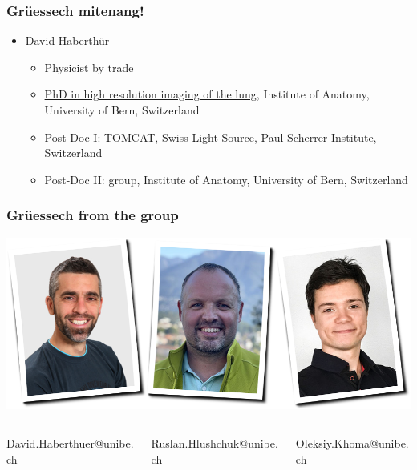 %


\begin{frame}
		\maketitle
\end{frame}

\begin{frame}
		\frametitle{Grüessech mitenang!}
		\begin{itemize}
				\item David Haberthür
						\begin{itemize}
								\item Physicist by trade
								\item \href{https://boris.unibe.ch/2619/}{PhD in high resolution imaging of the lung}, Institute of Anatomy, University of Bern, Switzerland
								\item Post-Doc I: \href{https://www.psi.ch/sls/tomcat/}{TOMCAT}, \href{https://www.psi.ch/sls/}{Swiss Light Source}, \href{https://www.psi.ch/}{Paul Scherrer Institute}, Switzerland
								\item Post-Doc II: \uct group, Institute of Anatomy, University of Bern, Switzerland
						\end{itemize}
		\end{itemize}
\end{frame}

\begin{frame}
		\frametitle{Grüessech from the \uct group}
		\centering%
		\includegraphics[width=\imagewidth]{./images/team}
		\begin{columns}[t,onlytextwidth]
				\hfill%
				\begin{column}{0.3\linewidth}
						David{\color{ubRed}.}Haberthuer{\color{ubRed}@unibe.ch}%
				\end{column}%
				\hfill%
				\begin{column}{0.3\linewidth}
						Ruslan{\color{ubRed}.}Hlushchuk{\color{ubRed}@unibe.ch}%
				\end{column}%
				\hfill%
				\begin{column}{0.3\linewidth}
						Oleksiy{\color{ubRed}.}Khoma{\color{ubRed}@unibe.ch}%
				\end{column}%
				\hfill%
		\end{columns}
\end{frame}

